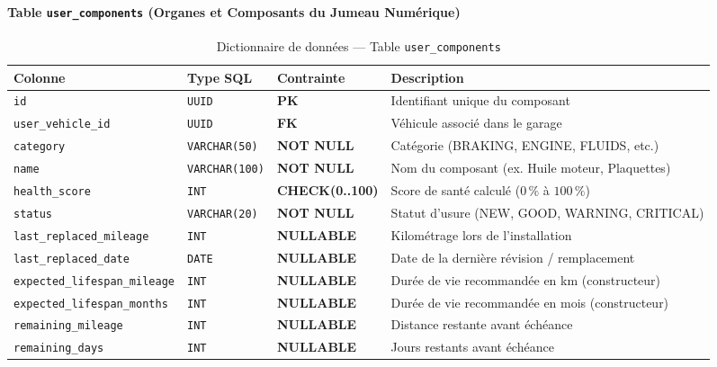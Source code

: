 \documentclass[12pt,a4paper,oneside]{report}
\begin{document}
\paragraph{Table \texttt{user\_components} (Organes et Composants du Jumeau Num\'erique)}
\begin{table}[H]
\centering
\small
\begin{tabularx}{\textwidth}{p{4.2cm} p{2.2cm} p{2cm} X}
\toprule
\textbf{Colonne} & \textbf{Type SQL} & \textbf{Contrainte} & \textbf{Description} \\
\midrule
\texttt{id} & \texttt{UUID} & \textbf{PK} & Identifiant unique du composant \\
\texttt{user\_vehicle\_id} & \texttt{UUID} & \textbf{FK} & V\'ehicule associ\'e dans le garage \\
\texttt{category} & \texttt{VARCHAR(50)} & \textbf{NOT NULL} & Cat\'egorie (BRAKING, ENGINE, FLUIDS, etc.) \\
\texttt{name} & \texttt{VARCHAR(100)} & \textbf{NOT NULL} & Nom du composant (ex. Huile moteur, Plaquettes) \\
\texttt{health\_score} & \texttt{INT} & \textbf{CHECK(0..100)} & Score de sant\'e calcul\'e ($0\,\%$ \`a $100\,\%$) \\
\texttt{status} & \texttt{VARCHAR(20)} & \textbf{NOT NULL} & Statut d'usure (NEW, GOOD, WARNING, CRITICAL) \\
\texttt{last\_replaced\_mileage} & \texttt{INT} & \textbf{NULLABLE} & Kilom\'etrage lors de l'installation \\
\texttt{last\_replaced\_date} & \texttt{DATE} & \textbf{NULLABLE} & Date de la derni\`ere r\'evision / remplacement \\
\texttt{expected\_lifespan\_mileage} & \texttt{INT} & \textbf{NULLABLE} & Dur\'ee de vie recommand\'ee en km (constructeur) \\
\texttt{expected\_lifespan\_months} & \texttt{INT} & \textbf{NULLABLE} & Dur\'ee de vie recommand\'ee en mois (constructeur) \\
\texttt{remaining\_mileage} & \texttt{INT} & \textbf{NULLABLE} & Distance restante avant \'ech\'eance \\
\texttt{remaining\_days} & \texttt{INT} & \textbf{NULLABLE} & Jours restants avant \'ech\'eance \\
\bottomrule
\end{tabularx}
\caption{Dictionnaire de donn\'ees --- Table \texttt{user\_components}}
\label{tab:user_components}
\end{table}
\end{document}
